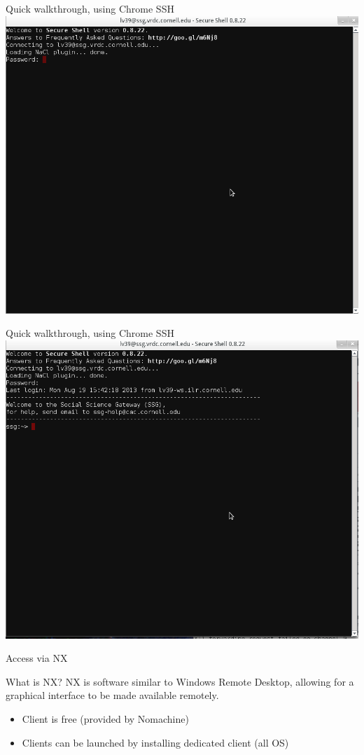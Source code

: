 \documentclass[xcolor=table,compress]{beamer}
\begin{document}
\begin{frame}{Quick walkthrough, using Chrome SSH}
\includegraphics[width=.9\textwidth]{chrome-ssh-screen2.png}
\end{frame}


\begin{frame}{Quick walkthrough, using Chrome SSH}
\includegraphics[width=.9\textwidth]{chrome-ssh-screen3.png}
\end{frame}



\begin{frame}{Access via NX}
\begin{block}{What is NX?}
NX is software similar to Windows Remote Desktop, allowing for a graphical interface to be made 
available remotely.
\end{block}
\begin{itemize}
\item Client is free (provided by Nomachine)
\item Clients can be launched by installing dedicated client (all OS)  
\end{itemize}
\end{frame}
\end{document}
